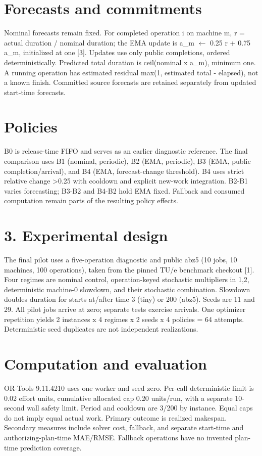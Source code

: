 \documentclass[10pt,a4paper]{article}
\begin{document}
\section*{Forecasts and commitments}
Nominal forecasts remain fixed. For completed operation i on machine m, r = actual duration / nominal duration; the EMA update is a\_m $\leftarrow$ 0.25 r + 0.75 a\_m, initialized at one [3]. Updates use only public completions, ordered deterministically. Predicted total duration is ceil(nominal x a\_m), minimum one. A running operation has estimated residual max(1, estimated total - elapsed), not a known finish. Committed source forecasts are retained separately from updated start-time forecasts.

\section*{Policies}
B0 is release-time FIFO and serves as an earlier diagnostic reference. The final comparison uses B1 (nominal, periodic), B2 (EMA, periodic), B3 (EMA, public completion/arrival), and B4 (EMA, forecast-change threshold). B4 uses strict relative change >0.25 with cooldown and explicit new-work integration. B2-B1 varies forecasting; B3-B2 and B4-B2 hold EMA fixed. Fallback and consumed computation remain parts of the resulting policy effects.

\newpage
\section*{3. Experimental design}
The final pilot uses a five-operation diagnostic and public abz5 (10 jobs, 10 machines, 100 operations), taken from the pinned TU/e benchmark checkout [1]. Four regimes are nominal control, operation-keyed stochastic multipliers in {1,2}, deterministic machine-0 slowdown, and their stochastic combination. Slowdown doubles duration for starts at/after time 3 (tiny) or 200 (abz5). Seeds are 11 and 29. All pilot jobs arrive at zero; separate tests exercise arrivals. One optimizer repetition yields 2 instances x 4 regimes x 2 seeds x 4 policies = 64 attempts. Deterministic seed duplicates are not independent realizations.

\section*{Computation and evaluation}
OR-Tools 9.11.4210 uses one worker and seed zero. Per-call deterministic limit is 0.02 effort units, cumulative allocated cap 0.20 units/run, with a separate 10-second wall safety limit. Period and cooldown are 3/200 by instance. Equal caps do not imply equal actual work. Primary outcome is realized makespan. Secondary measures include solver cost, fallback, and separate start-time and authorizing-plan-time MAE/RMSE. Fallback operations have no invented plan-time prediction coverage.
\end{document}
